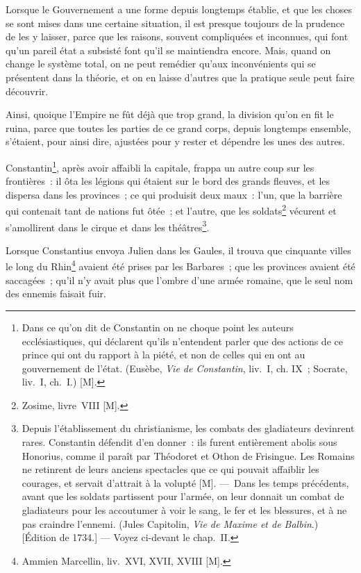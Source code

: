 \documentclass[french,twoside]{book} %
\begin{document}
Lorsque le Gouvernement a une forme depuis longtemps établie, et que les choses se sont mises dans une certaine situation, il est presque toujours de la prudence de les y laisser, parce que les raisons, souvent compliquées et inconnues, qui font qu’un pareil état a subsisté font qu’il se maintiendra encore. Mais, quand on change le système total, on ne peut remédier qu’aux inconvénients qui se présentent dans la théorie, et on en laisse d’autres que la pratique seule peut faire découvrir.\par
Ainsi, quoique l’Empire ne fût déjà que trop grand, la division qu’on en fit le ruina, parce que toutes les parties de ce grand corps, depuis longtemps ensemble, s’étaient, pour ainsi dire, ajustées pour y rester et dépendre les unes des autres.\par
Constantin\footnote{Dans ce qu’on dit de Constantin on ne choque point les auteurs ecclésiastiques, qui déclarent qu’ils n’entendent parler que des actions de ce prince qui ont du rapport à la piété, et non de celles qui en ont au gouvernement de l’état. (Eusèbe, {\itshape Vie de Constantin}, liv. I, ch. IX ; Socrate, liv. I, ch. I.) [M].}, après avoir affaibli la capitale, frappa un autre coup sur les frontières : il ôta les légions qui étaient sur le bord des grands fleuves, et les dispersa dans les provinces ; ce qui produisit deux maux : l’un, que la barrière qui contenait tant de nations fut ôtée ; et l’autre, que les soldats\footnote{Zosime, livre VIII [M].} vécurent et s’amollirent dans le cirque et dans les théâtres\footnote{Depuis l’établissement du christianisme, les combats des gladiateurs devinrent rares. Constantin défendit d’en donner : ils furent entièrement abolis sous Honorius, comme il paraît par Théodoret et Othon de Frisingue. Les Romains ne retinrent de leurs anciens spectacles que ce qui pouvait affaiblir les courages, et servait d’attrait à la volupté [M]. — Dans les temps précédents, avant que les soldats partissent pour l’armée, on leur donnait un combat de gladiateurs pour les accoutumer à voir le sang, le fer et les blessures, et à ne pas craindre l’ennemi. (Jules Capitolin, {\itshape Vie de Maxime et de Balbin}.) [Édition de 1734.] — Voyez ci-devant le chap. II.}.\par
Lorsque Constantius envoya Julien dans les Gaules, il trouva que cinquante villes le long du Rhin\footnote{Ammien Marcellin, liv. XVI, XVII, XVIII [M].} avaient été prises par les Barbares ; que les provinces avaient été saccagées ; qu’il n’y avait plus que l’ombre d’une armée romaine, que le seul nom des ennemis faisait fuir.\par
\end{document}
